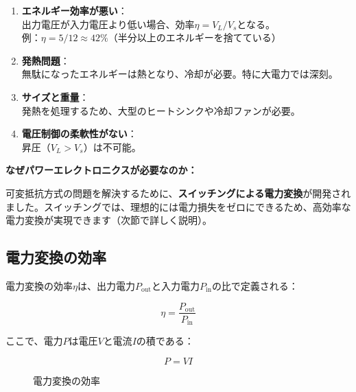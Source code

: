 \begin{enumerate}
\item \textbf{エネルギー効率が悪い}：\\
出力電圧が入力電圧より低い場合、効率$\eta = V_L/V_s$となる。\\
例：$\eta = 5/12 \approx 42\%$（半分以上のエネルギーを捨てている）

\item \textbf{発熱問題}：\\
無駄になったエネルギーは熱となり、冷却が必要。特に大電力では深刻。

\item \textbf{サイズと重量}：\\
発熱を処理するため、大型のヒートシンクや冷却ファンが必要。

\item \textbf{電圧制御の柔軟性がない}：\\
昇圧（$V_L > V_s$）は不可能。
\end{enumerate}

\begin{screen}
\textbf{なぜパワーエレクトロニクスが必要なのか：}

可変抵抗方式の問題を解決するために、\textbf{スイッチングによる電力変換}が開発されました。スイッチングでは、理想的には電力損失をゼロにできるため、高効率な電力変換が実現できます（次節で詳しく説明）。
\end{screen}

\subsection{電力変換の効率}

電力変換の効率$\eta$は、出力電力$P_{\text{out}}$と入力電力$P_{\text{in}}$の比で定義される：

\begin{equation}
\eta = \frac{P_{\text{out}}}{P_{\text{in}}}
\end{equation}

ここで、電力$P$は電圧$V$と電流$I$の積である：

\begin{equation}
P = VI
\end{equation}

\begin{figure}[H]
\centering
{}
\caption{電力変換の効率}
\label{fig:efficiency}
\end{figure}

